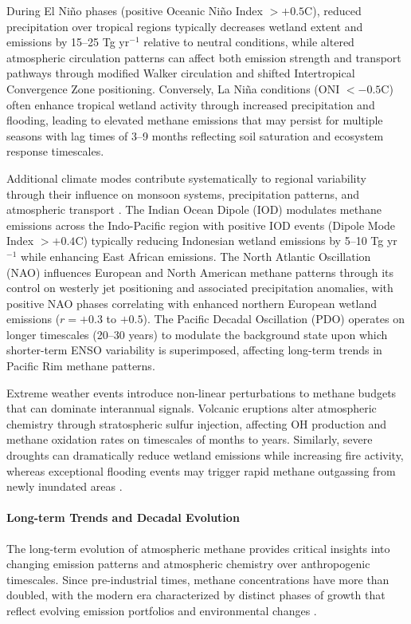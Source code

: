 During El Ni{\~n}o phases (positive Oceanic Ni{\~n}o Index $>+0.5$\textdegree C), reduced precipitation over tropical regions typically decreases wetland extent and  emissions by 15--25 Tg yr$^{-1}$ relative to neutral conditions, while altered atmospheric circulation patterns can affect both emission strength and transport pathways through modified Walker circulation and shifted Intertropical Convergence Zone positioning. Conversely, La Ni{\~n}a conditions (ONI $<-0.5$\textdegree C) often enhance tropical wetland activity through increased precipitation and flooding, leading to elevated methane emissions that may persist for multiple seasons with lag times of 3--9 months reflecting soil saturation and ecosystem response timescales.

Additional climate modes contribute systematically to regional  variability through their influence on monsoon systems, precipitation patterns, and atmospheric transport \cite{Karoff2023}. The Indian Ocean Dipole (IOD) modulates methane emissions across the Indo-Pacific region with positive IOD events (Dipole Mode Index $>+0.4$\textdegree C) typically reducing Indonesian wetland emissions by 5--10 Tg yr$^{-1}$ while enhancing East African emissions. The North Atlantic Oscillation (NAO) influences European and North American methane patterns through its control on westerly jet positioning and associated precipitation anomalies, with positive NAO phases correlating with enhanced northern European wetland emissions ($r = +0.3$ to $+0.5$). The Pacific Decadal Oscillation (PDO) operates on longer timescales (20--30 years) to modulate the background state upon which shorter-term ENSO variability is superimposed, affecting long-term trends in Pacific Rim methane patterns.

Extreme weather events introduce non-linear perturbations to methane budgets that can dominate interannual signals. Volcanic eruptions alter atmospheric chemistry through stratospheric sulfur injection, affecting OH production and methane oxidation rates on timescales of months to years. Similarly, severe droughts can dramatically reduce wetland emissions while increasing fire activity, whereas exceptional flooding events may trigger rapid methane outgassing from newly inundated areas \cite{Saunois2020}.

\paragraph{Long-term Trends and Decadal Evolution}
The long-term evolution of atmospheric methane provides critical insights into changing emission patterns and atmospheric chemistry over anthropogenic timescales. Since pre-industrial times, methane concentrations have more than doubled, with the modern era characterized by distinct phases of growth that reflect evolving emission portfolios and environmental changes \cite{Lan2025}.

